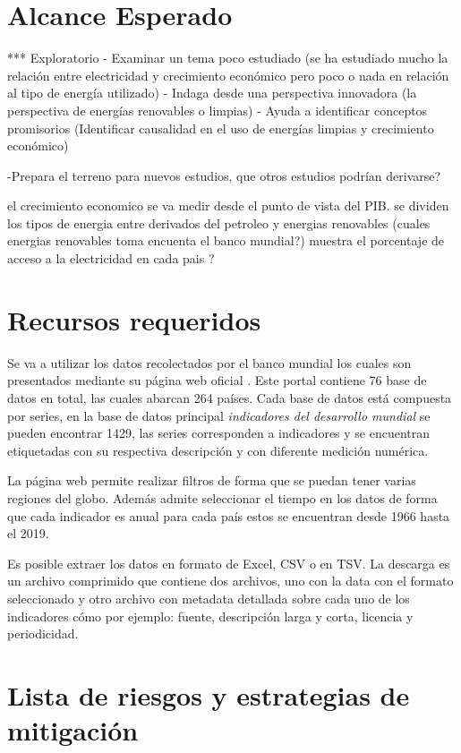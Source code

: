 \documentclass{article}
\begin{document}
\section{Alcance Esperado}
*** Exploratorio
- Examinar un tema poco estudiado (se ha estudiado mucho la relación entre electricidad y crecimiento económico pero poco o nada en relación al tipo de energía utilizado)
- Indaga desde una perspectiva innovadora (la perspectiva de energías renovables o limpias)
- Ayuda a identificar conceptos promisorios (Identificar causalidad en el uso de energías limpias y crecimiento económico)

-Prepara el terreno para nuevos estudios, que otros estudios podrían derivarse?

el crecimiento economico se va medir desde el punto de vista del PIB.
se dividen los tipos de energia entre derivados del petroleo y energias renovables (cuales energias renovables toma encuenta el banco mundial?)
muestra el porcentaje de acceso a la electricidad en cada pais ? %

\section{Recursos requeridos}

Se va a utilizar los datos recolectados por el banco mundial los cuales son presentados mediante su página web oficial \cite{noauthor_indicadores_nodate}. Este portal contiene 76 base de datos en total, las cuales abarcan 264 países. Cada base de datos está compuesta por series, en la base de datos principal \textit{indicadores del desarrollo mundial} se pueden encontrar 1429, las series corresponden a indicadores y se encuentran etiquetadas con su respectiva descripción y con diferente medición numérica.

La página web permite realizar filtros de forma que se puedan tener varias regiones del globo. Además admite seleccionar el tiempo en los datos de forma que cada indicador es anual para cada país estos se encuentran desde 1966 hasta el 2019. 

Es posible extraer los datos en formato de Excel, CSV o en TSV. La descarga es un archivo comprimido que contiene dos archivos, uno con la data con el formato seleccionado y otro  archivo con metadata detallada sobre cada uno de los indicadores cómo por ejemplo: fuente, descripción larga y corta, licencia y periodicidad. 


\section{Lista de riesgos y estrategias de mitigación}
\end{document}
